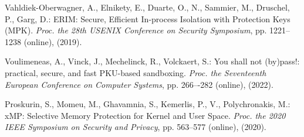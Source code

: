 \documentclass[english,sigrecommended,JIP]{ipsj}
\begin{document}
\begin{thebibliography}{99}
  Vahldiek-Oberwagner, A., Elnikety, E., Duarte, O., N., Sammier, M., Druschel, P., Garg, D.: ERIM: Secure, Efficient In-process Isolation with Protection Keys (MPK). \textit{Proc. the 28th USENIX Conference on Security Symposium}, pp. 1221--1238 (online),  (2019). 

Voulimeneas, A., Vinck, J., Mechelinck, R., Volckaert, S.: You shall not (by)pass!: practical, secure, and fast PKU-based sandboxing.
\textit{Proc. the Seventeenth European Conference on Computer Systems}, pp. 266–-282 (online),  (2022).


  Proskurin, S., Momeu, M., Ghavamnia, S., Kemerlis, P., V., Polychronakis, M.: xMP: Selective Memory Protection for Kernel and User Space.
  \textit{Proc. the 2020 IEEE Symposium on Security and Privacy}, pp. 563--577 (online),   (2020).


\end{thebibliography}
\end{document}
